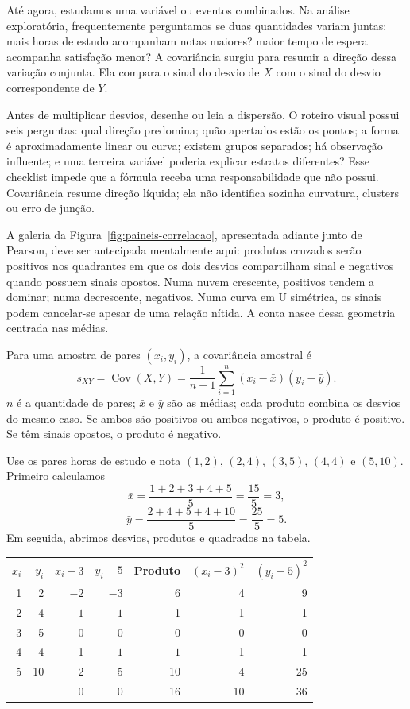 Até agora, estudamos uma variável ou eventos combinados. Na análise exploratória, frequentemente perguntamos se duas quantidades variam juntas: mais horas de estudo acompanham notas maiores? maior tempo de espera acompanha satisfação menor? A covariância surgiu para resumir a direção dessa variação conjunta. Ela compara o sinal do desvio de $X$ com o sinal do desvio correspondente de $Y$.

Antes de multiplicar desvios, desenhe ou leia a dispersão. O roteiro visual possui seis perguntas: qual direção predomina; quão apertados estão os pontos; a forma é aproximadamente linear ou curva; existem grupos separados; há observação influente; e uma terceira variável poderia explicar estratos diferentes? Esse checklist impede que a fórmula receba uma responsabilidade que não possui. Covariância resume direção líquida; ela não identifica sozinha curvatura, clusters ou erro de junção.

A galeria da Figura~\ref{fig:paineis-correlacao}, apresentada adiante junto de Pearson, deve ser antecipada mentalmente aqui: produtos cruzados serão positivos nos quadrantes em que os dois desvios compartilham sinal e negativos quando possuem sinais opostos. Numa nuvem crescente, positivos tendem a dominar; numa decrescente, negativos. Numa curva em U simétrica, os sinais podem cancelar-se apesar de uma relação nítida. A conta nasce dessa geometria centrada nas médias.

Para uma amostra de pares $(x_i,y_i)$, a covariância amostral é
\[
s_{XY}=\operatorname{Cov}(X,Y)=
\frac{1}{n-1}\sum_{i=1}^{n}(x_i-\bar{x})(y_i-\bar{y}).
\]
$n$ é a quantidade de pares; $\bar{x}$ e $\bar{y}$ são as médias; cada produto combina os desvios do mesmo caso. Se ambos são positivos ou ambos negativos, o produto é positivo. Se têm sinais opostos, o produto é negativo.

Use os pares horas de estudo e nota $(1,2)$, $(2,4)$, $(3,5)$, $(4,4)$ e $(5,10)$. Primeiro calculamos
\[
\bar{x}=\frac{1+2+3+4+5}{5}=\frac{15}{5}=3,
\]
\[
\bar{y}=\frac{2+4+5+4+10}{5}=\frac{25}{5}=5.
\]
Em seguida, abrimos desvios, produtos e quadrados na tabela.

\begin{center}
\small
\begin{tabular}{@{}rrrrrrr@{}}
\toprule
$x_i$ & $y_i$ & $x_i-3$ & $y_i-5$ & Produto & $(x_i-3)^2$ & $(y_i-5)^2$ \\
\midrule
1 & 2  & $-2$ & $-3$ & 6  & 4 & 9 \\
2 & 4  & $-1$ & $-1$ & 1  & 1 & 1 \\
3 & 5  & 0    & 0    & 0  & 0 & 0 \\
4 & 4  & 1    & $-1$ & $-1$ & 1 & 1 \\
5 & 10 & 2    & 5    & 10 & 4 & 25 \\
\midrule
 & & 0 & 0 & 16 & 10 & 36 \\
\bottomrule
\end{tabular}
\end{center}

